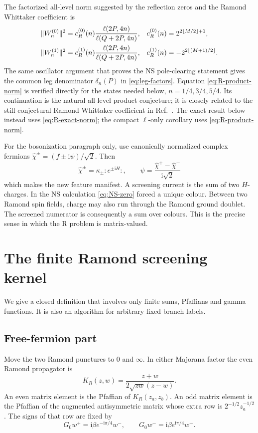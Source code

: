 \documentclass[11pt]{article}
\newcommand{\ii}{\mathrm i}
\begin{document}
The factorized all-level norm suggested by the reflection zeros and the
Ramond Whittaker coefficient is
\begin{align}
 \|W_n^{(0)}\|^2&=c_R^{(0)}(n)
 \frac{\ell(2P,4n)}{\ell(Q+2P,4n)},&
 c_R^{(0)}(n)&=2^{2\lfloor M/2\rfloor+1},\notag\\
 \|W_n^{(1)}\|^2&=c_R^{(1)}(n)
 \frac{\ell(2P,4n)}{\ell(Q+2P,4n)},&
 c_R^{(1)}(n)&=-2^{2\lfloor(M+1)/2\rfloor}.
 \label{eq:R-product-norm}
\end{align}
The same oscillator argument that proves the NS pole-clearing statement
gives the common leg denominator $\delta_n(P)$ in \eqref{eq:leg-factors}.
Equation \eqref{eq:R-product-norm} is verified directly for the states needed
below, $n=1/4,3/4,5/4$.  Its continuation is the natural all-level product
conjecture; it is closely related to the still-conjectural Ramond Whittaker
coefficient in Ref.~\cite{BS}.  The exact result below instead uses
\eqref{eq:R-exact-norm}; the compact $\ell$-only corollary uses
\eqref{eq:R-product-norm}.

For the bosonization paragraph only, use canonically normalized complex
fermions $\widehat\chi^\pm=(f\pm\ii\psi)/\sqrt2$.  Then
\begin{equation}
 \widehat\chi^\pm=\kappa_\pm:e^{\pm\ii H}:,\qquad
 \psi=\frac{\widehat\chi^+-\widehat\chi^-}{\ii\sqrt2}
 \label{eq:bosonization}
\end{equation}
which makes the
new feature manifest.  A screening current is the sum of two $H$-charges.
In the NS calculation \eqref{eq:NS-zero} forced a unique colour.  Between
two Ramond spin fields, charge may also run through the Ramond ground
doublet.  The screened numerator is consequently a sum over colours.  This
is the precise sense in which the R problem is matrix-valued.

\section{The finite Ramond screening kernel}
\label{sec:kernel}

We give a closed definition that involves only finite sums, Pfaffians and
gamma functions.  It is also an algorithm for arbitrary fixed branch
labels.

\subsection{Free-fermion part}

Move the two Ramond punctures to $0$ and $\infty$.  In either Majorana
factor the even Ramond propagator is
\begin{equation}
 K_R(z,w)=\frac{z+w}{2\sqrt{zw}(z-w)}.
 \label{eq:R-kernel}
\end{equation}
An even matrix element is the Pfaffian of $K_R(z_a,z_b)$.  An odd matrix
element is the Pfaffian of the augmented antisymmetric matrix whose extra
row is $2^{-1/2}z_a^{-1/2}$.  The signs of that row are fixed by
\begin{equation}
 G_0w^+=\ii\beta e^{-\ii\pi/4}w^-,\qquad
 G_0w^-=\ii\beta e^{\ii\pi/4}w^+.
 \label{eq:G0}
\end{equation}
\end{document}
